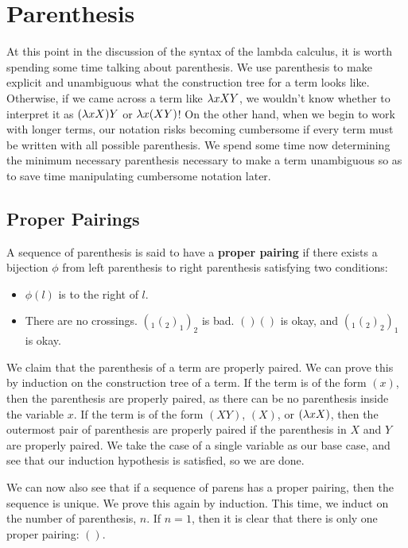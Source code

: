 \section{Parenthesis}
At this point in the discussion of the syntax of the lambda calculus, it is worth spending some time talking about parenthesis. We use parenthesis to make explicit and unambiguous what the construction tree for a term looks like. Otherwise, if we came across a term like $\lambda xXY$, we wouldn't know whether to interpret it as $(\lambda xX)Y$ or $\lambda x(XY)$! On the other hand, when we begin to work with longer terms, our notation risks becoming cumbersome if every term must be written with all possible parenthesis. We spend some time now determining the minimum necessary parenthesis necessary to make a term unambiguous so as to save time manipulating cumbersome notation later.

\subsection{Proper Pairings}
A sequence of parenthesis is said to have a \textbf{proper pairing} if there exists a bijection $\phi$ from left parenthesis to right parenthesis satisfying two conditions:
\begin{itemize}
  \item $\phi(l)$ is to the right of $l$.
  \item There are no crossings. $(_1(_2)_1)_2$ is bad. $()()$ is okay, and $(_1(_2)_2)_1$ is okay.
\end{itemize}
We claim that the parenthesis of a term are properly paired. We can prove this by induction on the construction tree of a term. If the term is of the form $(x)$, then the parenthesis are properly paired, as there can be no parenthesis inside the variable $x$. If the term is of the form $(XY)$, $(X)$, or $(\lambda xX)$, then the outermost pair of parenthesis are properly paired if the parenthesis in $X$ and $Y$ are properly paired. We take the case of a single variable as our base case, and see that our induction hypothesis is satisfied, so we are done.\\


We can now also see that if a sequence of parens has a proper pairing, then the sequence is unique. We prove this again by induction. This time, we induct on the number of parenthesis, $n$. If $n = 1$, then it is clear that there is only one proper pairing: $()$.\\

